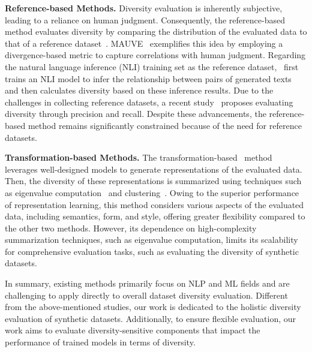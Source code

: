 \textbf{Reference-based Methods.} Diversity evaluation is inherently subjective, leading to a reliance on human judgment. Consequently, the reference-based method evaluates diversity by comparing the distribution of the evaluated data to that of a reference dataset~\citep{heusel2017gans}. MAUVE~\citep{pillutla2021mauve} exemplifies this idea by employing a divergence-based metric to capture correlations with human judgment. Regarding the natural language inference (NLI) training set as the reference dataset,~\citep{stasaski2022semantic} first trains an NLI model to infer the relationship between pairs of generated texts and then calculates diversity based on these inference results. Due to the challenges in collecting reference datasets, a recent study~\citep{le2024exploring} proposes evaluating diversity through precision and recall. Despite these advancements, the reference-based method remains significantly constrained because of the need for reference datasets.

\textbf{Transformation-based Methods.} The transformation-based~\citep{lee2023beyond} method leverages well-designed models to generate representations of the evaluated data. Then, the diversity of these representations is summarized using techniques such as eigenvalue computation~\citep{dan2023vendi} and clustering~\citep{du2019boosting}. 
Owing to the superior performance of representation learning, this method considers various aspects of the evaluated data, including semantics, form, and style, offering greater flexibility compared to the other two methods. However, its dependence on high-complexity summarization techniques, such as eigenvalue computation, limits its scalability for comprehensive evaluation tasks, such as evaluating the diversity of synthetic datasets. 

In summary, existing methods primarily focus on NLP and ML fields and are challenging to apply directly to overall dataset diversity evaluation. Different from the above-mentioned studies, our work is dedicated to the holistic diversity evaluation of synthetic datasets. Additionally, to ensure flexible evaluation, our work aims to evaluate diversity-sensitive components that impact the performance of trained models in terms of diversity.


